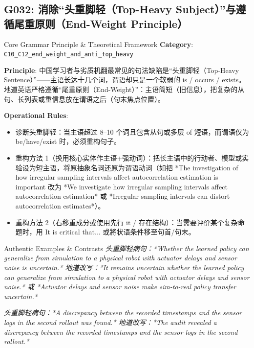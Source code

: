 \subsection{G032: 消除“头重脚轻（Top-Heavy Subject）”与遵循尾重原则（End-Weight Principle）}\label{sec:rule:G032}
\begin{ConceptBox}{Core Grammar Principle \& Theoretical Framework}
\textbf{Category}: \texttt{C10\_C12\_end\_weight\_and\_anti\_top\_heavy}\par\vspace{3pt}
\textbf{Principle}: 中国学习者与劣质机翻最常见的句法缺陷是“头重脚轻（Top-Heavy Sentence）”------主语长达十几个词，谓语却只是一个软弱的 is / occurs / exists。地道英语严格遵循“尾重原则（End-Weight）”：主语简短（旧信息），把复杂的从句、长列表或重信息放在谓语之后（句末焦点位置）。\par\vspace{4pt}
\textbf{Operational Rules}:
\begin{itemize}[leftmargin=1.5em, itemsep=1pt]
  \item 诊断头重脚轻：当主语超过 8--10 个词且包含从句或多层 of 短语，而谓语仅为 be/have/exist 时，必须重构句子。
  \item 重构方法 1（换用核心实体作主语+强动词）：把长主语中的行动者、模型或实验设为短主语，将原抽象名词还原为谓语动词（如把 *The investigation of how irregular sampling intervals affect autocorrelation estimation is important 改为 *We investigate how irregular sampling intervals affect autocorrelation estimation* 或 *Irregular sampling intervals can distort autocorrelation estimates*）。
  \item 重构方法 2（右移重成分或使用先行 it / 存在结构）：当需要评价某个复杂命题时，用 It is critical that... 或將状语条件移至句首/句末。
\end{itemize}
\end{ConceptBox}
\begin{ExampleBox}{Authentic Examples \& Contrasts}
\textit{头重脚轻病句：*Whether the learned policy can generalize from simulation to a physical robot with actuator delays and sensor noise is uncertain.*
地道改写：*It remains uncertain whether the learned policy can generalize from simulation to a physical robot with actuator delays and sensor noise.* 或 *Actuator delays and sensor noise make sim-to-real policy transfer uncertain.*}\par\vspace{2pt}
\textit{头重脚轻病句：*A discrepancy between the recorded timestamps and the sensor logs in the second rollout was found.*
地道改写：*The audit revealed a discrepancy between the recorded timestamps and the sensor logs in the second rollout.*}\par\vspace{2pt}
\end{ExampleBox}
